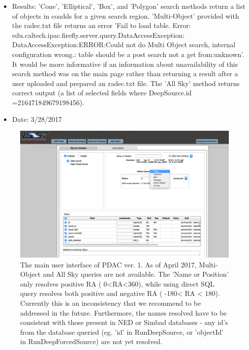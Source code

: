 \documentclass[DM,lsstdraft,toc,usenatbib]{lsstdoc}
\begin{document}
\begin{enumerate}
\begin{itemize}
     	\item Results: 'Cone', 'Elliptical', 'Box', and 'Polygon' search methods return a list of objects in coadds for a given search region.  'Multi-Object' provided with the radec.txt file  returns an error 'Fail to load table. Error: edu.caltech.ipac.firefly.server.query.DataAccessException: DataAccessException:ERROR:Could not do Multi Object search, internal configuration wrong.: table should be a post search not a get from:unknown'.  It would be more informative if an information about unavailability of this search method was on the main page rather than returning a result after a user uploaded and prepared an radec.txt file.   The 'All Sky' method returns correct output (a list of selected fields where DeepSource.id =216471849679198456). 
      \item Date: 3/28/2017
     \end{itemize}
\end{enumerate}

\begin{figure}
\includegraphics[width=\textwidth]{figs/1_PDAC_interface}
\caption{The main user interface of PDAC ver. 1. As of April 2017, Multi-Object and All Sky queries are not available. The 'Name or Position' only resolves positive RA  (  0\degree<RA<360\degree ), while using direct SQL query resolves both positive and negative RA ( -180\degree < RA < 180\degree ). Currently this is an inconsistency that we recommend to be addressed in the future. Furthermore, the names resolved have to be consistent with those present in NED or  Simbad databases - any id's from the database queried (eg. 'id' in RunDeepSource, or  'objectId' in RunDeepForcedSource) are not yet resolved.}
\label{fig:PDAC_interface}
\end{figure}
\end{document}
